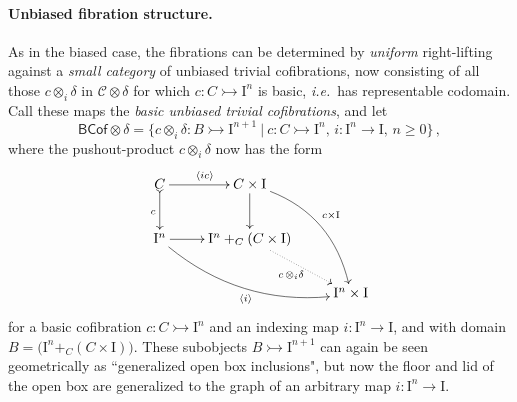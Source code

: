\documentclass[11pt]{amsart}
\newcommand{\ie}{\emph{i.e.}}
\newcommand{\mono}{\ensuremath{\rightarrowtail}}
\newcommand{\ra}{\ensuremath{\rightarrow}}
\newcommand{\gph}[1]{\ensuremath{\langle #1 \rangle}}
\newcommand{\I}{\ensuremath{\mathrm{I}}}
\theoremstyle{remark}
\theoremstyle{definition}
\begin{document}
\paragraph{Unbiased fibration structure.}\label{sec:unbiasedfibration}

As in the biased case, the fibrations can be determined by \emph{uniform} right-lifting against a  \emph{small category} of unbiased trivial cofibrations, now consisting of all those $c \otimes_i \delta$ in $\mathcal{C}\otimes \delta$ for which $c : C \mono \I^n$ is basic, \ie\ has representable codomain.  Call these maps the \emph{basic unbiased trivial cofibrations}, and let 
\begin{equation}\label{eq:basicunbiasedTCof}
\mathsf{BCof}\otimes \delta = \{c \otimes_i \delta : B \mono \I^{n+1}\ |\ c : C\mono \I^n,\, i : \I^n \ra \I,\,n\geq 0\}\,,
\end{equation}
where the pushout-product $c\otimes_i \delta$ now has the form
\begin{equation}\label{diagram:unbiasedbasicpushoutproduct}
\xymatrix{
C \ar@{>->}[d]_{c} \ar[r]^{\gph{ic}} & C\times \I \ar[d] \ar@/^4ex/ [rdd]^{c\times\I}\\
\I^n \ar@/_4ex/ [rrd]_{\gph{i}} \ar[r] &  \I^n +_C (C\times\I) \ar@{.>}[rd]_{c\, \otimes_i \delta} \\
&& \I^n\times\I
}
\end{equation}
for a basic cofibration $c : C\mono \I^n$ and an indexing map $i : \I^n \ra \I$, and with domain $B = \big(\I^n +_C (C\times\I)\big)$.   These subobjects $B \mono \I^{n+1}$ can again be seen geometrically as ``generalized open box inclusions", but now the floor and lid of the open box are generalized to the graph of an arbitrary map $i:\I^n\ra \I$.
\end{document}
